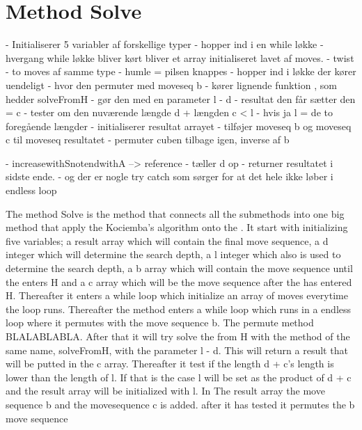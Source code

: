 \section{Method Solve}

- Initialiserer 5 variabler af forskellige typer
- hopper ind i en while l\o{}kke
- hvergang while l\o{}kke bliver k\o{}rt bliver et array initialiseret lavet af moves.
- twist
- to moves af samme type
-  humle = pilsen knappes
- hopper ind i l\o{}kke der k\o{}rer uendeligt
- hvor den permuter med moveseq b
- k\o{}rer lignende funktion , som hedder solveFromH
- g\o{}r den med en parameter l - d
- resultat den f\aa{}r s\ae{}tter den = c
- tester om den nuv\ae{}rende l\ae{}ngde d + l\ae{}ngden c < l
- hvis ja l = de to foreg\aa{}ende l\ae{}ngder
- initialiserer resultat arrayet
- tilf\o{}jer moveseq b og moveseq c til moveseq resultatet
- permuter cuben tilbage igen, inverse af b

- increasewithSnotendwithA --> reference
- t\ae{}ller d op
- returner resultatet i sidste ende.
-  og der er nogle try catch som s\o{}rger for at det hele ikke l\o{}ber i endless loop

The method Solve is the method that connects all the submethods into one big method that apply the Kociemba's algorithm onto the \rubik{}. It start with initializing five variables; a result array which will contain the final move sequence, a d integer which will determine the search depth, a l integer which also is used to determine the search depth, a b array which will contain the move sequence until the \rubik{} enters H and a c array which will be the move sequence after the \rubik{} has entered H. Thereafter it enters a while loop which initialize an array of moves everytime the loop runs. Thereafter the method enters a while loop which runs in a endless loop where it permutes with the move sequence b. The permute method BLALABLABLA. After that it will try solve the \rubik{} from H with the method of the same name, solveFromH, with the parameter l - d.  This will return a result that will be putted in the c array. Thereafter it test if the length d + c's length is lower than the length of l. If that is the case l will be set as the product of d + c and the result array will be initialized with l. In The result array the move sequence b and the movesequence c is added. after it has tested it permutes the b move sequence 



